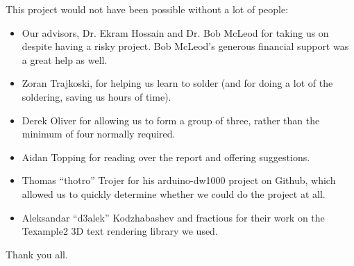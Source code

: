 \documentclass[
11pt, %
oneside, %
english, %
onehalfspacing, %
nolistspacing, %
hidelinks, %
headsepline, %
consistentlayout, %
table, %
]{MastersDoctoralThesis} %
\begin{document}
\begin{acknowledgements}
\addchaptertocentry{\acknowledgementname} %
This project would not have been possible without a lot of people:

\begin{itemize}
	\item Our advisors, Dr. Ekram Hossain and Dr. Bob McLeod for taking us on despite having a risky project. Bob McLeod's generous financial support was a great help as well.
	\item Zoran Trajkoski, for helping us learn to solder (and for doing a lot of the soldering, saving us hours of time).
	\item Derek Oliver for allowing us to form a group of three, rather than the minimum of four normally required. 
	\item Aidan Topping for reading over the report and offering suggestions.
	\item Thomas ``thotro'' Trojer for his arduino-dw1000 project on Github, which allowed us to quickly determine whether we could do the project at all.
	\item Aleksandar ``d3alek'' Kodzhabashev and fractious for their work on the Texample2 3D text rendering library we used.
\end{itemize}

Thank you all.
\end{acknowledgements}
\end{document}

